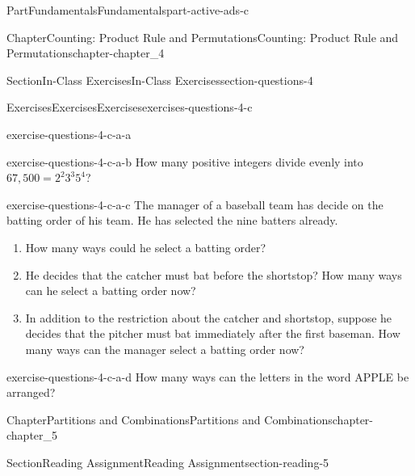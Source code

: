 \documentclass[oneside,10pt,]{book}
\numberwithin{equation}{section}
\begin{document}
\begin{partptx}{Part}{Fundamentals}{}{Fundamentals}{}{}{part-active-ads-c}
\begin{chapterptx}{Chapter}{Counting: Product Rule and Permutations}{}{Counting: Product Rule and Permutations}{}{}{chapter-chapter_4}
\begin{sectionptx}{Section}{In-Class Exercises}{}{In-Class Exercises}{}{}{section-questions-4}
\begin{exercises-subsection-numberless}{Exercises}{Exercises}{}{Exercises}{}{}{exercises-questions-4-c}
\begin{exercisegroup}
\begin{divisionexerciseeg}{1}{}{}{exercise-questions-4-c-a-a}
\end{divisionexerciseeg}%
\begin{divisionexerciseeg}{2}{}{}{exercise-questions-4-c-a-b}%
How many positive integers divide evenly into \(67,500=2^2 3^3 5^4\)?%
\end{divisionexerciseeg}%
\begin{divisionexerciseeg}{3}{}{}{exercise-questions-4-c-a-c}%
The manager of a baseball team has decide on the batting order of his team.  He has selected the nine batters already.%
\begin{enumerate}[label=(\alph*)]
\item{}How many ways could he select a batting order?%
\item{}He decides that the catcher must bat before the shortstop?  How many ways can he select a batting order now?%
\item{}In addition to the restriction about the catcher and shortstop, suppose he decides that the pitcher must bat immediately after the first baseman.  How many ways can the manager select a batting order now?%
\end{enumerate}
%
\end{divisionexerciseeg}%
\begin{divisionexerciseeg}{4}{}{}{exercise-questions-4-c-a-d}%
How many ways can the letters in the word APPLE be arranged?%
\end{divisionexerciseeg}%
\end{exercisegroup}
\par\medskip\noindent
\end{exercises-subsection-numberless}
\end{sectionptx}
\end{chapterptx}
%
\typeout{************************************************}
\typeout{************************************************}
%
\begin{chapterptx}{Chapter}{Partitions and Combinations}{}{Partitions and Combinations}{}{}{chapter-chapter_5}
\renewcommand*{\chaptername}{Chapter}
%
%
%
\typeout{************************************************}
\typeout{************************************************}
%
\begin{sectionptx}{Section}{Reading Assignment}{}{Reading Assignment}{}{}{section-reading-5}

\end{sectionptx}
\end{chapterptx}
\end{partptx}
\end{document}
